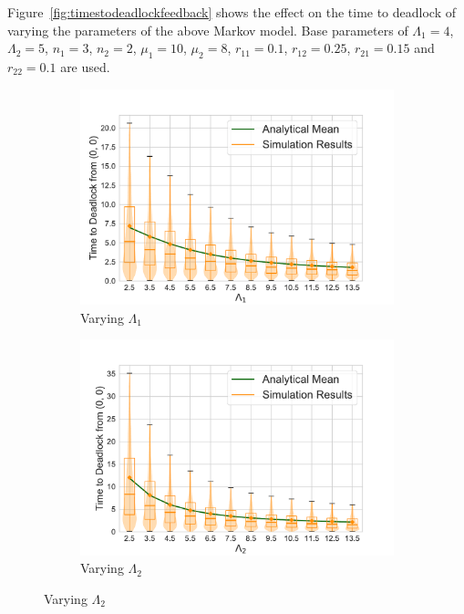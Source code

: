 \documentclass{article}
\numberwithin{equation}{section}
\begin{document}
Figure~\ref{fig:timestodeadlockfeedback} shows the effect on the time to
deadlock of varying the parameters of the above Markov model.
Base parameters of $\Lambda_1 = 4$, $\Lambda_2 = 5$, $n_1 = 3$, $n_2 = 2$,
$\mu_1 = 10$, $\mu_2 = 8$, $r_{11} = 0.1$, $r_{12} = 0.25$, $r_{21} = 0.15$
and $r_{22} = 0.1$ are used.


\begin{figure}[!htbp]
\begin{center}
\begin{subfigure}[b]{0.48\textwidth}
  \includegraphics[width=\textwidth]{images/2Nmsfb_varyL1}
  \caption{Varying $\Lambda_1$}
  \label{fig:timestodeadlockfb_L1}
\end{subfigure}
\begin{subfigure}[b]{0.48\textwidth}
  \includegraphics[width=\textwidth]{images/2Nmsfb_varyL2}
  \caption{Varying $\Lambda_2$}

\end{subfigure}
\end{center}
\end{figure}
\end{document}

